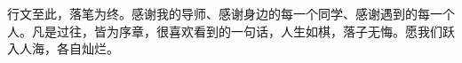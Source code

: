 \documentclass[
    type = bachelor,
    decl-page,  %
    twoside,                %
  ]{njuthesis}
\begin{document}
\printbibliography


\begin{acknowledgement}
  行文至此，落笔为终。感谢我的导师、感谢身边的每一个同学、感谢遇到的每一个人。凡是过往，皆为序章，很喜欢看到的一句话，人生如棋，落子无悔。愿我们跃入人海，各自灿烂。
\end{acknowledgement}




\appendix

\end{document}
